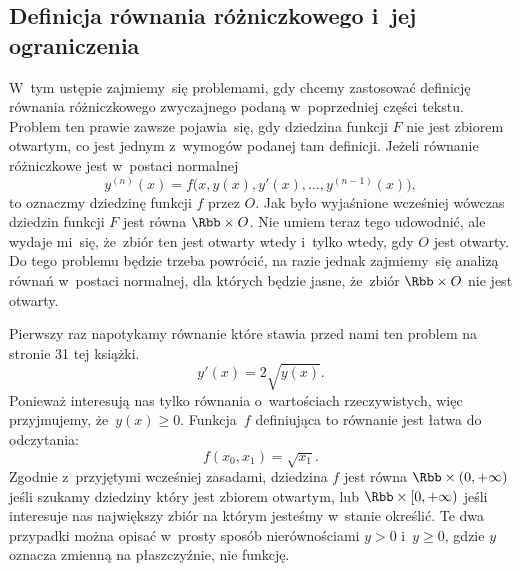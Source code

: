 \documentclass[a4paper,11pt]{article}
\numberwithin{equation}{section}
\begin{document}
\subsection{Definicja równania różniczkowego i~jej ograniczenia}

\label{subsec:Definicja-rownania-rozniczkowego-ETC}



W~tym ustępie zajmiemy~się problemami, gdy chcemy zastosować definicję
równania różniczkowego zwyczajnego podaną w~poprzedniej części tekstu.
Problem ten prawie zawsze pojawia~się, gdy dziedzina funkcji $F$ nie jest
zbiorem otwartym, co jest jednym z~wymogów podanej tam definicji. Jeżeli
równanie różniczkowe jest w~postaci normalnej
\begin{equation}
  \label{eq:Definicja-rownania-rozniczkowego-ETC-01}
  y^{ ( n ) }( x ) = f\big( x, y( x ), y'( x ), \ldots, y^{ ( n - 1 ) }( x ) \big),
\end{equation}
to oznaczmy dziedzinę funkcji $f$ przez $O$. Jak było wyjaśnione wcześniej
wówczas dziedzin funkcji $F$ jest równa $\Rbb \times O$. Nie umiem teraz tego
udowodnić, ale wydaje mi~się, że~zbiór ten jest otwarty wtedy i~tylko
wtedy, gdy $O$ jest otwarty. Do tego problemu będzie trzeba powrócić, na
razie jednak zajmiemy~się analizą równań w~postaci normalnej, dla których
będzie jasne, że~zbiór $\Rbb \times O$ nie jest otwarty.

Pierwszy raz napotykamy równanie które stawia przed nami ten problem na
stronie 31 tej książki.
\begin{equation}
  \label{eq:Definicja-rownania-rozniczkowego-ETC-02}
  y'( x ) = 2 \sqrt{ y( x ) }.
\end{equation}
Ponieważ interesują nas tylko równania o~wartościach rzeczywistych, więc
przyjmujemy, że~$y( x ) \geq 0$. Funkcja~$f$ definiująca to równanie jest
łatwa do odczytania:
\begin{equation}
  \label{eq:Definicja-rownania-rozniczkowego-ETC-03}
  f( x_{ 0 }, x_{ 1 } ) = \sqrt{ x_{ 1 } }.
\end{equation}
Zgodnie z~przyjętymi wcześniej zasadami, dziedzina $f$ jest równa
$\Rbb \times ( 0, +\infty )$ jeśli szukamy dziedziny który jest zbiorem otwartym, lub
$\Rbb \times [ 0, +\infty )$ jeśli interesuje nas największy zbiór na którym
jesteśmy w~stanie określić. Te dwa przypadki można opisać w~prosty sposób
nierównościami $y > 0$ i~$y \geq 0$, gdzie $y$ oznacza zmienną na
płaszczyźnie, nie funkcję.
\end{document}
